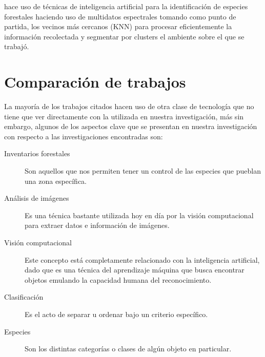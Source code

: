 \cite{rf10} hace uso de técnicas de inteligencia artificial para la identificación  de especies forestales haciendo uso de multidatos espectrales tomando como punto de partida, los vecinos más cercanos (KNN) para procesar eficientemente la información recolectada y segmentar por clusters el ambiente sobre el que se trabajó.

\pagebreak
 
\section{Comparación de trabajos}
La mayoría de los trabajos citados hacen uso de otra clase de tecnología que no tiene que ver directamente con la utilizada en nuestra investigación, más sin embargo, algunos de los aspectos clave que se presentan en nuestra investigación con respecto a las investigaciones encontradas son:

\begin{description}
\item[Inventarios forestales]{ Son aquellos que nos permiten tener un control de las especies que pueblan una zona específica.}
\end{description}

\begin{description}
\item[Análisis de imágenes]{Es una técnica bastante utilizada hoy en día por la visión computacional para extraer datos e información de imágenes.}
\end{description}

\begin{description}
\item[Visión computacional]{Este concepto está completamente relacionado con la inteligencia artificial, dado que es una  técnica del aprendizaje máquina que busca encontrar objetos emulando la capacidad humana del reconocimiento.}
\end{description}

\begin{description}
\item[Clasificación]{Es el acto de separar u ordenar bajo un criterio específico.}
\end{description}

\begin{description}
\item[Especies]{Son los distintas categorías o  clases de algún objeto en particular.}
\end{description}

